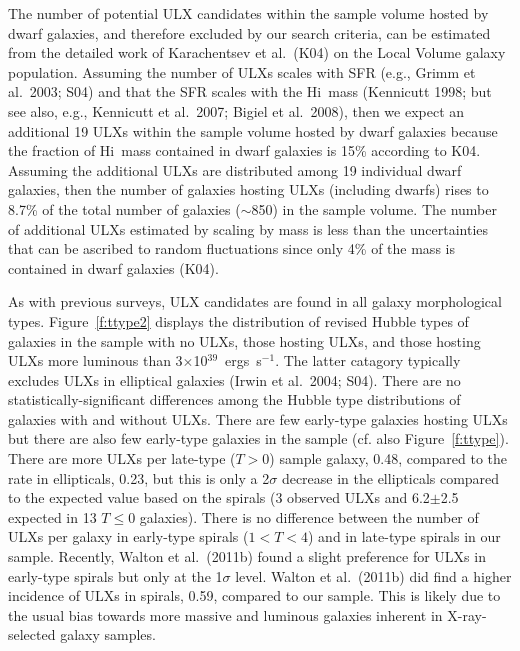 \documentclass{article}
\newcommand{\ergl}{ergs~s$^{-1}$}
\newcommand{\hi}{H{\sc i}}
\newcommand{\etal}{et al.}
\begin{document}
The number of potential ULX candidates within the sample volume hosted by dwarf galaxies,
 and therefore excluded by our search criteria, can be estimated from the detailed work of 
 Karachentsev \etal\ (K04) on the Local Volume galaxy population.
Assuming the number of ULXs scales with SFR (e.g., Grimm \etal\ 2003; S04) and that the SFR 
scales with the \hi\ mass 
 (Kennicutt 1998; but see also, e.g., Kennicutt \etal\ 2007; Bigiel \etal\ 2008), 
 then we expect an additional 19 ULXs within the sample volume hosted 
by dwarf galaxies because the fraction of \hi\ mass contained in dwarf galaxies is 15\% according to K04.
Assuming the additional ULXs are distributed among 19 individual dwarf
 galaxies, then the number of galaxies 
 hosting ULXs (including dwarfs) rises to %
 8.7\% of the total number of galaxies ($\sim$850) in the sample volume.
The number of additional ULXs estimated by scaling by mass is less than the uncertainties
 that can be ascribed to random fluctuations since only 4\% of the mass is contained in dwarf galaxies (K04).

As with previous surveys, ULX candidates are found in all galaxy morphological types.
Figure~\ref{f:ttype2} displays the distribution of revised Hubble types of galaxies in the sample with no ULXs,
 those hosting ULXs, and those hosting ULXs more luminous than 3$\times$10$^{39}$~\ergl.
The latter catagory typically excludes ULXs in elliptical galaxies (Irwin \etal\ 2004; S04).
There are no statistically-significant differences among the Hubble type distributions of 
galaxies with and without ULXs. There are few early-type galaxies hosting ULXs but there 
are also few early-type galaxies in the sample (cf. also Figure~\ref{f:ttype}). 
%
There are more ULXs per late-type ($T>0$) sample galaxy, 0.48,  compared to
 the rate in ellipticals, 0.23, but this is only a 2$\sigma$ decrease in the ellipticals 
 compared to the expected value based on the spirals (3 observed ULXs and 6.2$\pm$2.5
 expected in 13 $T\le0$ galaxies).
There is no difference between the number of ULXs per galaxy in early-type spirals
 ($1<T<4$) and in late-type spirals in our sample.
Recently, Walton \etal\ (2011b) found a slight preference for ULXs in early-type spirals
 but only at the 1$\sigma$ level. Walton \etal\ (2011b) did find a higher incidence of ULXs
 in spirals, 0.59, compared to our sample. 
This is likely due to the usual bias towards more massive and luminous galaxies
 inherent in X-ray-selected galaxy samples.
\end{document}
